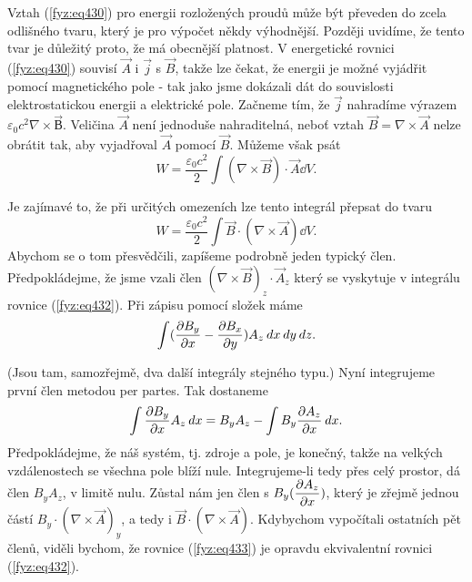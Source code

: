 {  Vztah (\ref{fyz:eq430}) pro energii rozložených proudů může být převeden do zcela odlišného 
  tvaru, který je pro výpočet někdy výhodnější. Později uvidíme, že tento tvar je důležitý proto, 
  že má obecnější platnost. V energetické rovnici (\ref{fyz:eq430}) souvisí \(\vec{A}\) i 
  \(\vec{j}\) s \(\vec{B}\), takže lze čekat, že energii je možné vyjádřit pomocí magnetického pole 
  - tak jako jsme dokázali dát do souvislosti elektrostatickou energii a elektrické pole. Začneme 
  tím, že \(\vec{j}\) nahradíme výrazem \(\varepsilon_0c^2\nabla\times\vec{В}\). Veličina 
  \(\vec{A}\) není jednoduše nahraditelná, neboť vztah \(\vec{B}=\nabla\times\vec{A}\) nelze 
  obrátit tak, aby vyjadřoval \(\vec{A}\) pomocí \(\vec{B}\). Můžeme však psát
  \begin{equation}\label{fyz:eq432}
    W = \frac{\varepsilon_0c^2}{2}\int(\nabla\times\vec{B})\cdot\vec{A}\dd{V}.
  \end{equation}
  
  Je zajímavé to, že při určitých omezeních lze tento integrál přepsat do tvaru
  \begin{equation}\label{fyz:eq433}
    W = \frac{\varepsilon_0c^2}{2}\int\vec{B}\cdot(\nabla\times\vec{A})\dd{V}.
  \end{equation}
  Abychom se o tom přesvědčili, zapíšeme podrobně jeden typický člen. Předpokládejme, že jsme vzali 
  člen \((\nabla\times\vec{B})_z\cdot\vec{A}_z\) který se vyskytuje v integrálu rovnice 
  (\ref{fyz:eq432}). Při zápisu pomocí složek máme
  \begin{equation*}
    \int(\dfrac{\partial B_y}{\partial x} - \dfrac{\partial B_x}{\partial y})A_z\hspace{2pt}dx\hspace{2pt}dy\hspace{2pt}dz.
  \end{equation*}
  
  (Jsou tam, samozřejmě, dva další integrály stejného typu.) Nyní integrujeme první člen metodou 
  per partes. Tak dostaneme
  \begin{equation*}
    \int\dfrac{\partial B_y}{\partial x}A_z\hspace{2pt}dx = B_yA_z - \int B_y\dfrac{\partial A_z}{\partial x}\hspace{2pt}dx.
  \end{equation*}
  Předpokládejme, že náš systém, tj. zdroje a pole, je konečný, takže na velkých vzdálenostech se 
  všechna pole blíží nule. Integrujeme-li tedy přes celý prostor, dá člen \(B_yA_z\), v limitě 
  nulu. Zůstal nám jen člen s \(B_y(\dfrac{\partial A_z}{\partial x})\), který je zřejmě jednou částí 
  \(B_y\cdot(\nabla\times\vec{A})_y\), a tedy i \(\vec{B}\cdot(\nabla\times\vec{A})\). Kdybychom 
  vypočítali ostatních pět členů, viděli bychom, že rovnice (\ref{fyz:eq433}) je opravdu 
  ekvivalentní rovnici (\ref{fyz:eq432}). 
  
}
